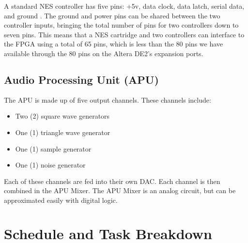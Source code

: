 \documentclass[a4paper]{article}
\begin{document}
A standard NES controller has five pins: +5v, data clock, data latch, serial data, and ground \cite{controller}. The ground and power pins can be shared between the two controller inputs, bringing the total number of pins for two controllers down to seven pins. This means that a NES cartridge and two controllers can interface to the FPGA using a total of 65 pins, which is less than the 80 pins we have available through the 80 pins on the Altera DE2's expansion ports.

\subsection{Audio Processing Unit (APU)}
The APU is made up of five output channels. These channels include:
	\begin{itemize}
    	\item Two (2) square wave generators
        \item One (1) triangle wave generator
        \item One (1) sample generator
        \item One (1) noise generator
    \end{itemize}
    Each of these channels are fed into their own DAC. Each channel is then combined in the APU Mixer. The APU Mixer is an analog circuit, but can be approximated easily with digital logic.\cite{nesdev}


\section{Schedule and Task Breakdown}
\end{document}
